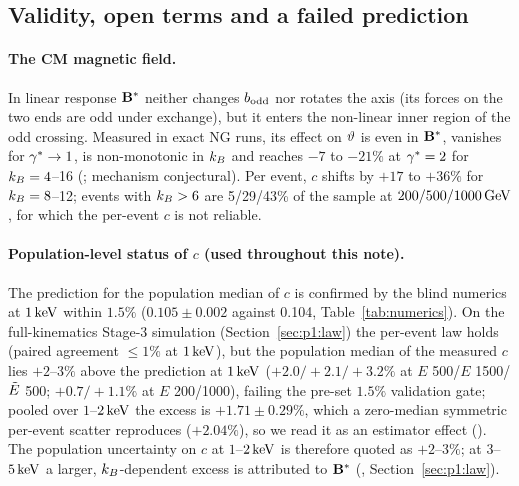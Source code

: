 \subsection{Validity, open terms and a failed prediction}\label{sec:string:valid}
\paragraph{The CM magnetic field.} In linear response $\mathbf{B}^*$ neither changes $b_{\rm odd}$ nor rotates the axis (its forces on
the two ends are odd under exchange), but it enters the non-linear inner region of the odd crossing. Measured in exact
NG runs, its effect on $\vartheta$ is even in $\mathbf{B}^*$, vanishes for $\gamma^*\to1$, is non-monotonic in $k_B$ and reaches
$-7$ to $-21\%$ at $\gamma^*=2$ for $k_B=4$--16 (\EST{}; mechanism conjectural). Per event, $c$ shifts by $+17$ to $+36\%$
for $k_B=8$--12; events with $k_B>6$ are 5/29/43\% of the sample at $200/500/1000\,\mathrm{GeV}$, for which the per-event $c$ is
not reliable. \paragraph{Population-level status of $c$ (used throughout this note).} The prediction for the population median of
$c$ is confirmed by the blind numerics at $1\,\mathrm{keV}$ within $1.5\%$ ($0.105\pm0.002$ against 0.104,
Table~\ref{tab:numerics}). On the full-kinematics Stage-3 simulation (Section~\ref{sec:p1:law}) the per-event law
holds (paired agreement $\le1\%$ at $1\,\mathrm{keV}$), but the population median of the measured $c$ lies $+2$--$3\%$ above the
prediction at $1\,\mathrm{keV}$ ($+2.0/+2.1/+3.2\%$ at $E$ 500/$E$ 1500/$\tilde{E}$ 500; $+0.7/+1.1\%$ at $E$ 200/1000), failing
the pre-set $1.5\%$ validation gate; pooled over $1$--$2\,\mathrm{keV}$ the excess is $+1.71\pm0.29\%$, which a zero-median
symmetric per-event scatter reproduces ($+2.04\%$), so we read it as an estimator effect (\EST{}). The population
uncertainty on $c$ at $1$--$2\,\mathrm{keV}$ is therefore quoted as $+2$--$3\%$; at $3$--$5\,\mathrm{keV}$ a larger, $k_B$-dependent excess
is attributed to $\mathbf{B}^*$ (\EST{}, Section~\ref{sec:p1:law}).

